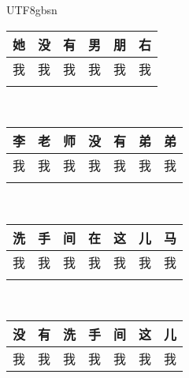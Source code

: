 \documentclass{article}
\newlength\mycolw
\newcommand{\myfont}{gbsn} %
\begin{document}
 
\begin{CJK}{UTF8}{\myfont} 

\Huge
\setlength{}
\addtolength\mycolw{-2\tabcolsep}
\begin{tabular}{|p{\mycolw}|p{\mycolw}|p{\mycolw}|p{\mycolw}|p{\mycolw}|p{\mycolw}|} \hline
她 &没 &有 &男 &朋 &右 \\ \hline
\color{white} 我 &\color{white} 我 &\color{white} 我 &\color{white} 我 &\color{white} 我 & \color{white} 我 \\ \hline
\multicolumn{6}{|l|}{} \\ \hline
\end{tabular}
\\ \vspace{0.3 in}
\setlength{}
\addtolength\mycolw{-2\tabcolsep}
\begin{tabular}{|p{\mycolw}|p{\mycolw}|p{\mycolw}|p{\mycolw}|p{\mycolw}|p{\mycolw}|p{\mycolw}|} \hline
李 &老 &师 &没 &有 &弟 &弟 \\ \hline
\color{white} 我 &\color{white} 我 &\color{white} 我 &\color{white} 我 &\color{white} 我 &\color{white} 我 & \color{white} 我 \\ \hline
\multicolumn{7}{|l|}{} \\ \hline
\end{tabular}
\\ \vspace{0.3 in}
\setlength{}
\addtolength\mycolw{-2\tabcolsep}
\begin{tabular}{|p{\mycolw}|p{\mycolw}|p{\mycolw}|p{\mycolw}|p{\mycolw}|p{\mycolw}|p{\mycolw}|} \hline
洗 &手 &间 &在 &这 &儿 &马 \\ \hline
\color{white} 我 &\color{white} 我 &\color{white} 我 &\color{white} 我 &\color{white} 我 &\color{white} 我 & \color{white} 我 \\ \hline
\multicolumn{7}{|l|}{} \\ \hline
\end{tabular}
\\ \vspace{0.3 in}
\setlength{}
\addtolength\mycolw{-2\tabcolsep}
\begin{tabular}{|p{\mycolw}|p{\mycolw}|p{\mycolw}|p{\mycolw}|p{\mycolw}|p{\mycolw}|p{\mycolw}|} \hline
没 &有 &洗 &手 &间 &这 &儿 \\ \hline
\color{white} 我 &\color{white} 我 &\color{white} 我 &\color{white} 我 &\color{white} 我 &\color{white} 我 & \color{white} 我 \\ \hline

\end{tabular}
\end{CJK}
\end{document}
